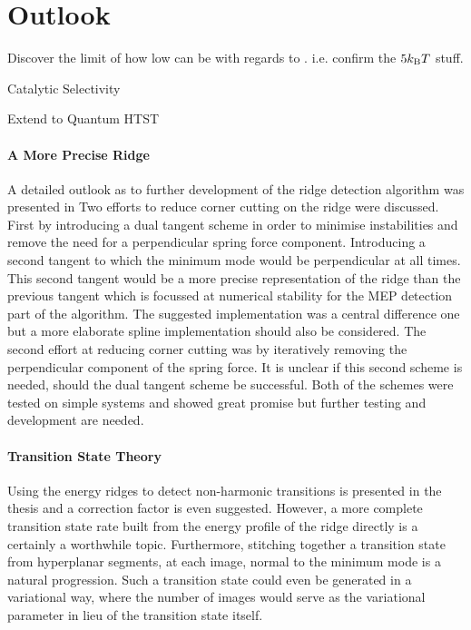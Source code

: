 \section{Outlook}
\label{sec:summary-outlook}

\bit
\item Discover the limit of how low  can be with regards to . i.e. confirm the $5k_\text{B} T$ stuff.
\item Catalytic Selectivity
\item Extend to Quantum HTST
\eit

\paragraph{A More Precise Ridge}
A detailed outlook as to further development of the ridge detection algorithm was presented in 
Two efforts to reduce corner cutting on the ridge were discussed.
First by introducing a dual tangent scheme in order to minimise instabilities and remove the need for a perpendicular spring force component.
Introducing a second tangent to which the minimum mode would be perpendicular at all times.
This second tangent would be a more precise representation of the ridge than the previous tangent which is focussed at numerical stability for the MEP detection part of the algorithm.
The suggested implementation was a central difference one but a more elaborate spline implementation should also be considered.
The second effort at reducing corner cutting was by iteratively removing the perpendicular component of the spring force.
It is unclear if this second scheme is needed, should the dual tangent scheme be successful.
Both of the schemes were tested on simple systems and showed great promise but further testing and development are needed.

\paragraph{Transition State Theory}
Using the energy ridges to detect non-harmonic transitions is presented in the thesis and a correction factor is even suggested.
However, a more complete transition state rate built from the energy profile of the ridge directly is a certainly a worthwhile topic.
Furthermore, stitching together a transition state from hyperplanar segments, at each image, normal to the minimum mode is a natural progression.
Such a transition state could even be generated in a variational way, where the number of images would serve as the variational parameter in lieu of the transition state itself.

